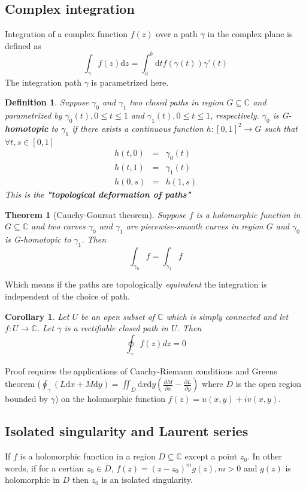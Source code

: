 \documentclass{article}
\newtheorem{theorem}{Theorem}
\newtheorem{definition}{Definition}
\newtheorem{corollary}{Corollary}[theorem]
\newcommand{\eq}{\begin{equation}}
\newcommand{\qe}{\end{equation}}
\newcommand{\diff}{\mathrm{d}}
\begin{document}
\begin{appendices}
\subsection{Complex integration}
Integration of a complex function $f(z)$ over a path $\gamma$ in the complex plane is defined as 
\eq
 \int_{\gamma} f(z) \diff z = \int_{a}^{b} \diff t f(\gamma(t))\gamma'(t) 
\qe
The integration path $\gamma$ is parametrized here. 
\begin{definition}
Suppose $\gamma_{0}$ and $\gamma_{1}$ two closed paths in region $G \subseteq \mathbb{C}$ and parametrized by $\gamma_{0}(t), 0\leq t \leq1$ and $\gamma_{1}(t), 0 \leq t \leq1$, respectively.  $\gamma_{0}$ is G-\textbf{homotopic} to $\gamma_{1}$ if there exists a continuous function $h:[0, 1]^{2} \to G$ such that $\forall t, s \in [0, 1]$
 \begin{eqnarray}
   h(t, 0) &=& \gamma_{0}(t) \nonumber \\
   h(t, 1) &=& \gamma_{1}(t)\\
   h(0, s)&=& h(1,s) \nonumber
 \end{eqnarray}
This is the \textbf{"topological deformation of paths"}
\end{definition}

\begin{theorem}[Cauchy-Goursat theorem]
Suppose $f$ is a holomorphic function in $G\subseteq \mathbb{C}$ and two carves $\gamma_{0}$ and $\gamma_{1}$ are \textit{piecewise-smooth curves} in region $G$  and $\gamma_{0}$ is G-homotopic to $\gamma_{1}$. Then 
\eq
 \int_{\gamma_{0}} f = \int_{\gamma_{1}} f
\qe
\end{theorem}
Which means if the paths are topologically \emph{equivalent} the integration is independent of the choice of path.
\begin{corollary}
Let $U$ be an open subset of $\mathbb{C}$ which is simply connected and let $f : U \rightarrow \mathbb{C}$. Let $\gamma$ is a rectifiable closed path in $U$. Then
\eq
\oint_{\gamma} f(z) dz = 0
\qe 
\end{corollary}
Proof requires the applications of Cauchy-Riemann conditions and Greens theorem ($\oint_{\gamma} (L \diff x + M \diff y) = \iint_{D}\diff x \diff y (\frac{\partial M}{\partial x} -\frac{\partial L}{\partial y} ) $ where $D$ is the open region bounded by $\gamma$) on the holomorphic function $f(z) = u (x, y) + i v(x, y)$. 
\subsection{Isolated singularity and Laurent series}
If $f$ is a holomorphic function in a region $D\subseteq \mathbb{C}$ except a point $z_{0}$. In other words, if for a certian $z_{0} \in D$, $f(z) = (z-z_{0})^{m} g(z), m > 0$ and $g(z)$ is holomorphic in $D$ then $z_{0}$ is an isolated singularity. 


\end{appendices}
\end{document}
